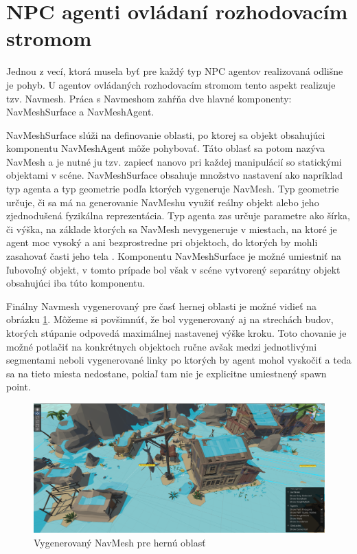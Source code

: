 \documentclass[slovak, master]{diploma}
\begin{document}
\section{NPC agenti ovládaní rozhodovacím stromom}
\label{sec:AgentsWithTrees}
Jednou z vecí, ktorá musela byť pre každý typ NPC agentov realizovaná odlišne je pohyb. U agentov ovládaných rozhodovacím stromom tento aspekt realizuje tzv. Navmesh. Práca s Navmeshom zahŕňa dve hlavné komponenty: NavMeshSurface a NavMeshAgent. 

NavMeshSurface slúži na definovanie oblasti, po ktorej sa objekt obsahujúci komponentu NavMeshAgent môže pohybovať. Táto oblasť sa potom nazýva NavMesh a je nutné ju tzv. zapiecť nanovo pri každej manipulácií so statickými objektami v scéne. NavMeshSurface obsahuje množstvo nastavení ako napríklad typ agenta a typ geometrie podľa ktorých vygeneruje NavMesh. Typ geometrie určuje, či sa má na generovanie NavMeshu využiť reálny objekt alebo jeho zjednodušená fyzikálna reprezentácia. Typ agenta zas určuje parametre ako šírka, či výška, na základe ktorých sa NavMesh nevygeneruje v miestach, na ktoré je agent moc vysoký a ani bezprostredne pri objektoch, do ktorých by mohli zasahovať časti jeho tela \cite{NavMeshSurface}. Komponentu NavMeshSurface je možné umiestniť na ľubovoľný objekt, v tomto prípade bol však v scéne vytvorený separátny objekt obsahujúci iba túto komponentu. 

Finálny Navmesh vygenerovaný pre časť hernej oblasti je možné vidieť na obrázku \ref{pic:NavMesh}. Môžeme si povšimnúť, že bol vygenerovaný aj na strechách budov, ktorých stúpanie odpovedá maximálnej nastavenej výške kroku. Toto chovanie je možné potlačiť na konkrétnych objektoch ručne avšak medzi jednotlivými segmentami neboli vygenerované linky po ktorých by agent mohol vyskočiť a teda sa na tieto miesta nedostane, pokiaľ tam nie je explicitne umiestnený spawn point. 

\begin{figure}[!htbp]
    \centering
    \includegraphics[width=1\textwidth]{Figures/navmesh.png}
    \caption{Vygenerovaný NavMesh pre hernú oblasť}
    \label{pic:NavMesh}
\end{figure}
\end{document}
